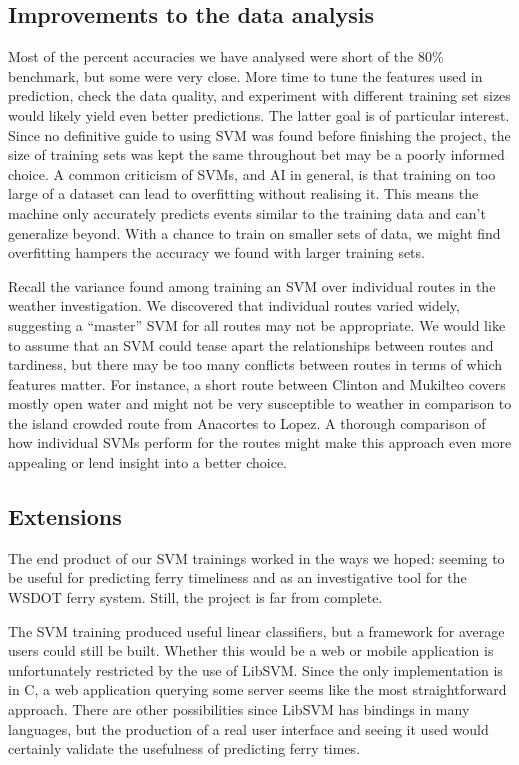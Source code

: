 \documentclass[11pt]{article} %
\begin{document}
\subsection{Improvements to the data analysis}
\label{sec:improvements}
Most of the percent accuracies we have analysed were short of the $80\%$ benchmark,
but some were very close. More time to tune the features used in prediction, 
check the data quality, and experiment with different training set sizes would
likely yield even better predictions. The latter goal is of particular interest.
Since no definitive guide to using SVM was found before finishing the project, 
the size of training sets was kept the same throughout bet may be a poorly informed
choice. A common criticism of SVMs, and AI in general, is that training on too
large of a dataset can lead to overfitting without realising it. This means the
machine only accurately predicts events similar to the training data
and can't generalize beyond. With a chance to train on smaller sets of data,
we might find overfitting hampers the accuracy we found with larger training sets.

Recall the variance found among training an SVM over individual routes in the 
weather investigation. We discovered that individual routes varied widely, 
suggesting a 
``master'' SVM for all routes may not be appropriate. We would like to assume that
an SVM could tease apart the relationships between routes and tardiness, but there
may be too many conflicts between routes in terms of which features matter. For 
instance, a short route between Clinton and Mukilteo covers mostly open water
and might not be very susceptible to weather in comparison to the island crowded
route from Anacortes to Lopez. A thorough comparison of how individual SVMs 
perform for the routes might make this approach even more appealing or lend 
insight into a better choice.


\subsection{Extensions}
\label{sec:extensions}
The end product of our SVM trainings worked in the ways we hoped: seeming to be 
useful for predicting ferry timeliness and as an investigative tool for the
WSDOT ferry system. Still, the project is far from complete. 

The SVM training produced useful linear classifiers, but a framework for average
users could still be built. Whether this would be a web or mobile application is
unfortunately restricted by the use of LibSVM. Since the only implementation is in 
C, a web application querying some server seems like the most straightforward
approach. There are other possibilities since LibSVM has bindings in many languages,
but the production of a real user interface and seeing it used would certainly 
validate the usefulness of predicting ferry times.
\end{document}
